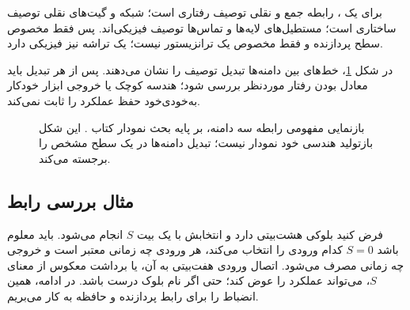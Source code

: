 برای یک ، رابطه جمع و نقلی توصیف رفتاری است؛
شبکه  و گیت‌های نقلی توصیف ساختاری است؛
مستطیل‌های لایه‌ها و تماس‌ها توصیف فیزیکی‌اند.
پس  فقط مخصوص سطح پردازنده و  فقط مخصوص یک ترانزیستور نیست؛
یک تراشه نیز  فیزیکی دارد.

در شکل \ref{fig:design-domains}، خط‌های بین دامنه‌ها تبدیل توصیف را نشان می‌دهند.
پس از هر تبدیل باید معادل بودن رفتار موردنظر بررسی شود؛
هندسه کوچک یا خروجی ابزار خودکار به‌خودی‌خود حفظ عملکرد را ثابت نمی‌کند.
\begin{figure}[ht]
\centering
\begin{latin}
\end{latin}
\caption{بازنمایی مفهومی رابطه سه دامنه، بر پایه بحث نمودار  کتاب
\cite{weste}. این شکل بازتولید هندسی خود نمودار  نیست؛
تبدیل دامنه‌ها در یک سطح مشخص را برجسته می‌کند.}
\label{fig:design-domains}
\end{figure}

\subsection{مثال بررسی رابط}
فرض کنید بلوکی  هشت‌بیتی دارد و انتخابش با یک بیت \(S\) انجام می‌شود.
باید معلوم باشد \(S=0\) کدام ورودی را انتخاب می‌کند، هر ورودی چه زمانی معتبر است
و خروجی چه زمانی مصرف می‌شود. اتصال ورودی هفت‌بیتی به آن، یا برداشت معکوس از
معنای \(S\)، می‌تواند عملکرد را عوض کند؛ حتی اگر نام بلوک درست باشد.
در ادامه، همین انضباط را برای رابط پردازنده و حافظه به کار می‌بریم.
